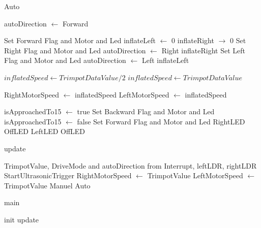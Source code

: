 \documentclass[12pt]{article}
\begin{document}
\begin{algorithm}
\caption{Auto}
\begin{algorithmic}
\STATE autoDirection $\leftarrow$ Forward

\STATE Set Forward Flag and Motor and Led
\STATE inflateLeft $\leftarrow$ 0
\STATE inflateRight $\rightarrow$ 0
\STATE Set Right Flag and Motor and Led
\STATE autoDirection $\leftarrow$ Right
\STATE inflateRight
\STATE Set Left Flag and Motor and Led
\STATE autoDirection $\leftarrow$ Left
\STATE inflateLeft
\ENDIF

\STATE $inflatedSpeed \leftarrow TrimpotDataValue/2$
\ELSE 
\STATE $inflatedSpeed \leftarrow TrimpotDataValue$
\ENDIF

\STATE RightMotorSpeed $\leftarrow$ inflatedSpeed
\STATE LeftMotorSpeed $\leftarrow$ inflatedSpeed



\STATE isApproachedTo15 $\leftarrow$ true
\STATE Set Backward Flag and Motor and Led	
\ENDIF
{}
\STATE isApproachedTo15 $\leftarrow$ false
\STATE Set Forward Flag and Motor and Led
\ENDIF
{}
\STATE RightLED
\ELSE
\STATE OffLED
\ENDIF
\ENDIF
{}
\STATE LeftLED
\ELSE
\STATE OffLED
\ENDIF
\ENDIF
\ENDIF
\end{algorithmic}
\end{algorithm}

\begin{algorithm}
\caption{update}
\begin{algorithmic} 
\REQUIRE TrimpotValue,  DriveMode and autoDirection from Interrupt, leftLDR, rightLDR
\STATE StartUltrasonicTrigger
\STATE RightMotorSpeed $\leftarrow$ TrimpotValue
\STATE LeftMotorSpeed $\leftarrow$ TrimpotValue
\STATE Manuel
\ELSE
\STATE Auto
\ENDIF
\end{algorithmic}
\end{algorithm}



\begin{algorithm}
\caption{main}
\begin{algorithmic} 
\STATE init
\STATE update
\ENDWHILE
\end{algorithmic}
\end{algorithm}
\end{document}
